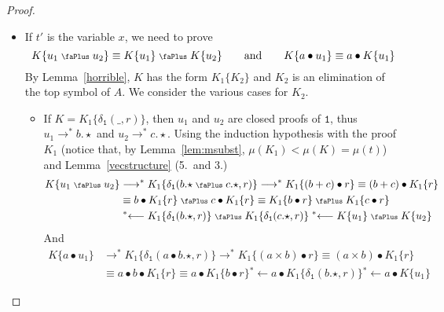 \documentclass[screen, sigconf,authorversion,nonacm]{acmart}
\theoremstyle{acmdefinition}
\numberwithin{equation}{section}
\newcommand\plus{\mathrel{\text{\normalfont\scalebox{0.7}{\faPlus}}}}
\newcommand\lra{\longrightarrow}
\newcommand\lras{\lra^*}
\newcommand\llas{\mathrel{{}^*{\longleftarrow}}}
\newcommand\one{\ensuremath{\mathtt 1}}
\newcommand\elimone{\delta_{\one}}
\begin{document}
\begin{proof}
\begin{itemize}
    \item If $t'$ is the variable $x$, we need to prove
      $$K\{u_1 \plus u_2\} \equiv K\{u_1\} \plus K\{u_2\}
      \qquad\textrm{and}\qquad
      K\{a \bullet u_1\} \equiv a \bullet K\{u_1\}$$
      By Lemma~\ref{horrible},
      $K$ has the form $K_1\{K_2\}$ and $K_2$ is an elimination of the top symbol of $A$.
      We consider the various cases for $K_2$. 
      \begin{itemize}
	\item If $K = K_1\{\elimone(\_,r)\}$, then $u_1$ and $u_2$ are closed
	  proofs of $\one$, thus $u_1 \lras b.\star$ and $u_2\lras c.\star$.
%
	  Using the induction hypothesis with the proof $K_1$
	  (notice that, by Lemma~\ref{lem:msubst}, $\mu(K_1) < \mu(K) = \mu(t)$) and Lemma~\ref{vecstructure} (5.~and 3.)
	  \begin{align*}
	    K\{u_1 \plus u_2\}
	    &\lras K_1 \{\elimone({b.\star} \plus c.\star,r)\}
	    \lras K_1 \{(b + c) \bullet r\}
	    \equiv (b + c) \bullet K_1 \{r\}\\
	    &\equiv b \bullet K_1 \{r\} \plus c \bullet K_1 \{r\}
	    \equiv K_1 \{b \bullet r\} \plus K_1 \{c \bullet r\}\\
	    & \llas K_1 \{\elimone(b.\star,r)\} \plus K_1 \{\elimone(c.\star,r)\}
	    \llas K\{u_1\} \plus K\{u_2\}
	  \end{align*}
	  And
	  \begin{align*}
	    K\{a \bullet u_1\}
	    &\lras K_1 \{\elimone(a \bullet b.\star,r)\}
	    \lras K_1 \{(a \times b) \bullet r\}
	    \equiv (a \times b) \bullet  K_1 \{r\}\\
	   & \equiv a \bullet b \bullet  K_1 \{r\}
	    \equiv a \bullet  K_1 \{b \bullet r\}
	     \llas a \bullet K_1 \{\elimone(b.\star,r)\}
	    \llas a \bullet K\{u_1\}
	  \end{align*}


\end{itemize}
\end{itemize}
\end{proof}
\end{document}
